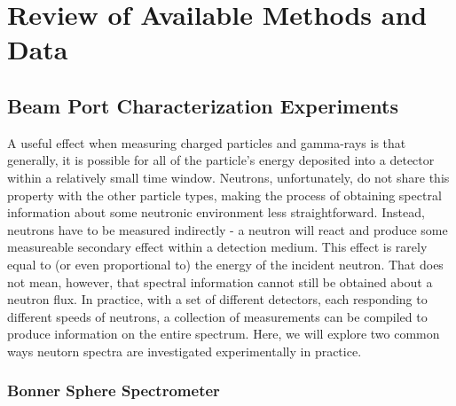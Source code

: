 \cleardoublepage

\chapter{Review of Available Methods and Data}


\section{Beam Port Characterization Experiments}

A useful effect when measuring charged particles and gamma-rays is that generally, it is possible for all of the particle's energy deposited into a detector within a relatively small time window.
Neutrons, unfortunately, do not share this property with the other particle types, making the process of obtaining spectral information about some neutronic environment less straightforward.
Instead, neutrons have to be measured indirectly - a neutron will react and produce some measureable secondary effect within a detection medium.
This effect is rarely equal to (or even proportional to) the energy of the incident neutron.
That does not mean, however, that spectral information cannot still be obtained about a neutron flux.
In practice, with a set of different detectors, each responding to different speeds of neutrons, a collection of measurements can be compiled to produce information on the entire spectrum.
Here, we will explore two common ways neutorn spectra are investigated experimentally in practice.

\subsection{Bonner Sphere Spectrometer}

